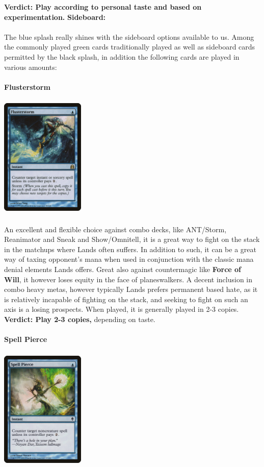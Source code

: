 \documentclass{report}
\begin{document}
\textbf{Verdict: Play according to personal taste and based on experimentation.}
\textbf{Sideboard:\\\\}
The blue splash really shines with the sideboard options available to us. Among the commonly played green cards traditionally played as well as sideboard cards permitted by the black splash, in addition the following cards are played in various amounts:\\\\
\newpage
\textbf{Flusterstorm\\}
\begin{center}
\includegraphics [width = 4cm, height = 6cm] {flusterstorm}
\end{center}
An excellent and flexible choice against combo decks, like ANT/Storm, Reanimator and Sneak and Show/Omnitell, it is a great way to fight on the stack in the matchups where Lands often suffers. In addition to such, it can be a great way of taxing opponent's mana when used in conjunction with the classic mana denial elements Lands offers. Great also against countermagic like \textbf{Force of Will}, it however loses equity in the face of planeswalkers. A decent inclusion in combo heavy metas, however typically Lands prefers permanent based hate, as it is relatively incapable of fighting on the stack, and seeking to fight on such an axis is a losing prospects. When played, it is generally played in 2-3 copies.\\
\textbf{Verdict: Play 2-3 copies,} depending on taste.\\\\
\textbf{Spell Pierce\\}
\begin{center}
\includegraphics [width = 4cm, height = 6cm] {spell-pierce}
\end{center}
\end{document}
